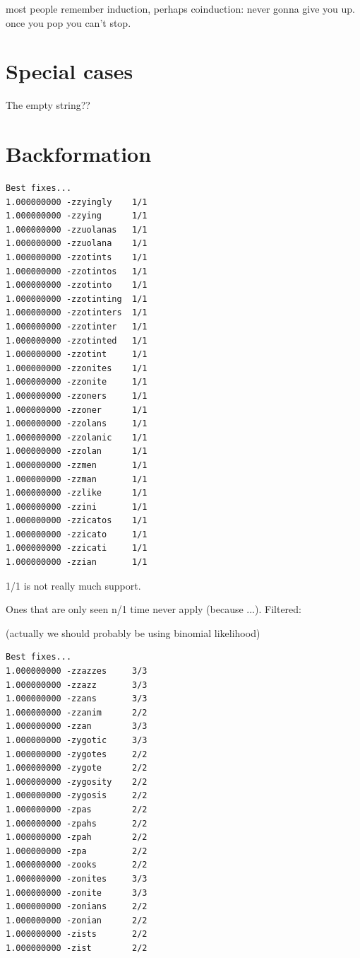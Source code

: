 \documentclass[twocolumn]{article}
\begin{document}
most people remember induction, perhaps 
coinduction: never gonna give you up. once you pop you can't stop.

\section{Special cases}

The empty string??

\section{Backformation} \label{sec:backformation}

\begin{verbatim}
Best fixes...
1.000000000 -zzyingly    1/1
1.000000000 -zzying      1/1
1.000000000 -zzuolanas   1/1
1.000000000 -zzuolana    1/1
1.000000000 -zzotints    1/1
1.000000000 -zzotintos   1/1
1.000000000 -zzotinto    1/1
1.000000000 -zzotinting  1/1
1.000000000 -zzotinters  1/1
1.000000000 -zzotinter   1/1
1.000000000 -zzotinted   1/1
1.000000000 -zzotint     1/1
1.000000000 -zzonites    1/1
1.000000000 -zzonite     1/1
1.000000000 -zzoners     1/1
1.000000000 -zzoner      1/1
1.000000000 -zzolans     1/1
1.000000000 -zzolanic    1/1
1.000000000 -zzolan      1/1
1.000000000 -zzmen       1/1
1.000000000 -zzman       1/1
1.000000000 -zzlike      1/1
1.000000000 -zzini       1/1
1.000000000 -zzicatos    1/1
1.000000000 -zzicato     1/1
1.000000000 -zzicati     1/1
1.000000000 -zzian       1/1
\end{verbatim}
1/1 is not really much support.

Ones that are only seen n/1 time never apply (because ...). Filtered:

(actually we should probably be using binomial likelihood)

\begin{verbatim}
Best fixes...
1.000000000 -zzazzes     3/3
1.000000000 -zzazz       3/3
1.000000000 -zzans       3/3
1.000000000 -zzanim      2/2
1.000000000 -zzan        3/3
1.000000000 -zygotic     3/3
1.000000000 -zygotes     2/2
1.000000000 -zygote      2/2
1.000000000 -zygosity    2/2
1.000000000 -zygosis     2/2
1.000000000 -zpas        2/2
1.000000000 -zpahs       2/2
1.000000000 -zpah        2/2
1.000000000 -zpa         2/2
1.000000000 -zooks       2/2
1.000000000 -zonites     3/3
1.000000000 -zonite      3/3
1.000000000 -zonians     2/2
1.000000000 -zonian      2/2
1.000000000 -zists       2/2
1.000000000 -zist        2/2
\end{verbatim}
\end{document}
